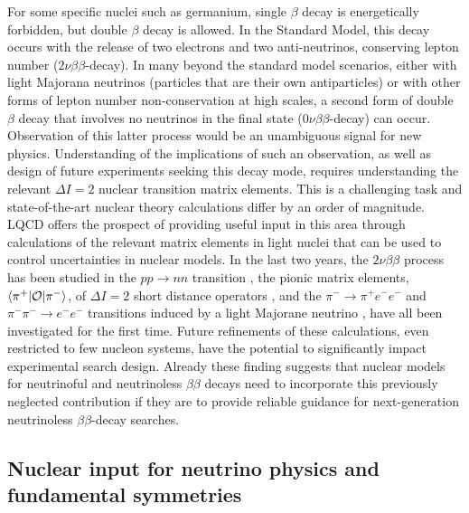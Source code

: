 For some specific nuclei such as germanium, single $\beta$ decay is energetically forbidden, but double $\beta$ decay is allowed. In the Standard Model, this decay occurs with the release of two electrons and two anti-neutrinos, conserving lepton number  ($2\nu\beta\beta$-decay). In many beyond the standard model scenarios, either with light Majorana neutrinos (particles that are their own antiparticles) or with other forms of lepton number non-conservation at high scales,  a second form of  double $\beta$ decay that involves no neutrinos in the final state ($0\nu\beta\beta$-decay) can occur. Observation of this latter process would be an unambiguous signal for new physics. Understanding of the implications of such an observation, as well as design of future experiments seeking this decay mode, requires understanding the relevant $\Delta I=2$ nuclear transition matrix elements. This is a challenging task and state-of-the-art nuclear theory calculations differ by an order of magnitude. LQCD offers the prospect of providing useful input in this area through calculations of the relevant matrix elements in light nuclei that can be used to control uncertainties in nuclear models. In the last two years, the $2\nu\beta\beta$ process has been studied in the $pp\to nn$ transition \cite{Tiburzi:2017iux,Shanahan:2017bgi},  the pionic matrix elements, $\langle \pi^+ | {\cal O} | \pi^- \rangle$, of $\Delta I =2$ short distance operators \cite{Nicholson:2018mwc}, and the $\pi^-\to \pi^+ e^- e^-$ and $\pi^-\pi^-\to e^-e^-$ transitions induced  by a light Majorane neutrino \cite{Feng:2018pdq,Murphy2018ICHEP}, have all been investigated for the first time. Future refinements of these calculations, even restricted to few nucleon systems, have the potential to significantly impact experimental search design.  Already  these finding suggests that nuclear models for neutrinoful and neutrinoless $\beta\beta$ decays need to incorporate this previously neglected contribution if they are to provide reliable guidance for next-generation neutrinoless $\beta\beta$-decay searches. 




\subsection{Nuclear input for neutrino physics and fundamental symmetries}


